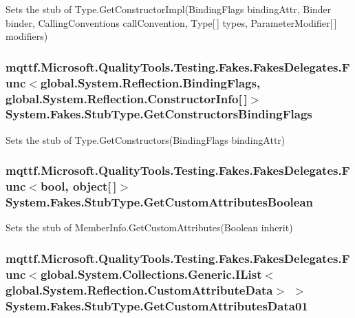 Sets the stub of Type.\-Get\-Constructor\-Impl(\-Binding\-Flags binding\-Attr, Binder binder, Calling\-Conventions call\-Convention, Type\mbox{[}$\,$\mbox{]} types, Parameter\-Modifier\mbox{[}$\,$\mbox{]} modifiers)

\hypertarget{class_system_1_1_fakes_1_1_stub_type_a50c7e9dc7afe6625c4ca8f12eb78b762}{
\subsubsection[{Get\-Constructors\-Binding\-Flags}]{\setlength{\rightskip}{0pt plus 5cm}mqttf.\-Microsoft.\-Quality\-Tools.\-Testing.\-Fakes.\-Fakes\-Delegates.\-Func$<$global.\-System.\-Reflection.\-Binding\-Flags, global.\-System.\-Reflection.\-Constructor\-Info\mbox{[}$\,$\mbox{]}$>$ System.\-Fakes.\-Stub\-Type.\-Get\-Constructors\-Binding\-Flags}}\label{class_system_1_1_fakes_1_1_stub_type_a50c7e9dc7afe6625c4ca8f12eb78b762}


Sets the stub of Type.\-Get\-Constructors(\-Binding\-Flags binding\-Attr)

\hypertarget{class_system_1_1_fakes_1_1_stub_type_a7dff25f1dccac31bd57ff00e2633dd61}{
\subsubsection[{Get\-Custom\-Attributes\-Boolean}]{\setlength{\rightskip}{0pt plus 5cm}mqttf.\-Microsoft.\-Quality\-Tools.\-Testing.\-Fakes.\-Fakes\-Delegates.\-Func$<$bool, object\mbox{[}$\,$\mbox{]}$>$ System.\-Fakes.\-Stub\-Type.\-Get\-Custom\-Attributes\-Boolean}}\label{class_system_1_1_fakes_1_1_stub_type_a7dff25f1dccac31bd57ff00e2633dd61}


Sets the stub of Member\-Info.\-Get\-Custom\-Attributes(\-Boolean inherit)

\hypertarget{class_system_1_1_fakes_1_1_stub_type_a55c3badc596b20057bbe026e1e477a67}{
\subsubsection[{Get\-Custom\-Attributes\-Data01}]{\setlength{\rightskip}{0pt plus 5cm}mqttf.\-Microsoft.\-Quality\-Tools.\-Testing.\-Fakes.\-Fakes\-Delegates.\-Func$<$global.\-System.\-Collections.\-Generic.\-I\-List$<$global.\-System.\-Reflection.\-Custom\-Attribute\-Data$>$ $>$ System.\-Fakes.\-Stub\-Type.\-Get\-Custom\-Attributes\-Data01}}\label{class_system_1_1_fakes_1_1_stub_type_a55c3badc596b20057bbe026e1e477a67}


